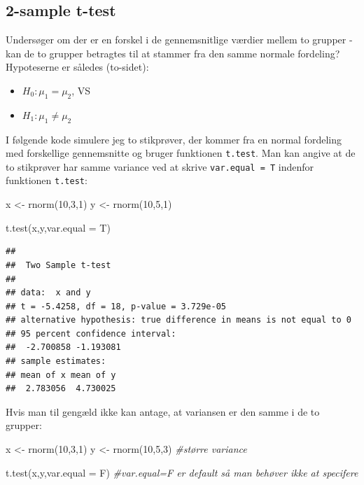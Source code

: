 \documentclass[
]{book}
\newenvironment{Shaded}{\begin{snugshade}}{\end{snugshade}}
\newcommand{\AttributeTok}[1]{\textcolor[rgb]{0.77,0.63,0.00}{#1}}
\newcommand{\CommentTok}[1]{\textcolor[rgb]{0.56,0.35,0.01}{\textit{#1}}}
\newcommand{\DecValTok}[1]{\textcolor[rgb]{0.00,0.00,0.81}{#1}}
\newcommand{\FunctionTok}[1]{\textcolor[rgb]{0.00,0.00,0.00}{#1}}
\newcommand{\NormalTok}[1]{#1}
\newcommand{\OtherTok}[1]{\textcolor[rgb]{0.56,0.35,0.01}{#1}}
\providecommand{\tightlist}{%
  \setlength{\itemsep}{0pt}\setlength{\parskip}{0pt}}
\begin{document}
\hypertarget{sample-t-test-1}{%
\subsection{2-sample t-test}\label{sample-t-test-1}}

Undersøger om der er en forskel i de gennemsnitlige værdier mellem to grupper - kan de to grupper betragtes til at stammer fra den samme normale fordeling? Hypoteserne er således (to-sidet):

\begin{itemize}
\tightlist
\item
  \(H_{0}: \mu_{1} = \mu_{2}\), VS
\item
  \(H_{1}: \mu_{1} \neq \mu_{2}\)
\end{itemize}

I følgende kode simulere jeg to stikprøver, der kommer fra en normal fordeling med forskellige gennemsnitte og bruger funktionen \texttt{t.test}. Man kan angive at de to stikprøver har samme variance ved at skrive \texttt{var.equal\ =\ T} indenfor funktionen \texttt{t.test}:

\begin{Shaded}
\begin{Highlighting}[]
\NormalTok{x }\OtherTok{\textless{}{-}} \FunctionTok{rnorm}\NormalTok{(}\DecValTok{10}\NormalTok{,}\DecValTok{3}\NormalTok{,}\DecValTok{1}\NormalTok{)}
\NormalTok{y }\OtherTok{\textless{}{-}} \FunctionTok{rnorm}\NormalTok{(}\DecValTok{10}\NormalTok{,}\DecValTok{5}\NormalTok{,}\DecValTok{1}\NormalTok{)}

\FunctionTok{t.test}\NormalTok{(x,y,}\AttributeTok{var.equal =}\NormalTok{ T)}
\end{Highlighting}
\end{Shaded}

\begin{verbatim}
## 
##  Two Sample t-test
## 
## data:  x and y
## t = -5.4258, df = 18, p-value = 3.729e-05
## alternative hypothesis: true difference in means is not equal to 0
## 95 percent confidence interval:
##  -2.700858 -1.193081
## sample estimates:
## mean of x mean of y 
##  2.783056  4.730025
\end{verbatim}

Hvis man til gengæld ikke kan antage, at variansen er den samme i de to grupper:

\begin{Shaded}
\begin{Highlighting}[]
\NormalTok{x }\OtherTok{\textless{}{-}} \FunctionTok{rnorm}\NormalTok{(}\DecValTok{10}\NormalTok{,}\DecValTok{3}\NormalTok{,}\DecValTok{1}\NormalTok{)}
\NormalTok{y }\OtherTok{\textless{}{-}} \FunctionTok{rnorm}\NormalTok{(}\DecValTok{10}\NormalTok{,}\DecValTok{5}\NormalTok{,}\DecValTok{3}\NormalTok{) }\CommentTok{\#større variance}

\FunctionTok{t.test}\NormalTok{(x,y,}\AttributeTok{var.equal =}\NormalTok{ F) }\CommentTok{\#var.equal=F er \textquotesingle{}default\textquotesingle{} så man behøver ikke at specifere}
\end{Highlighting}
\end{Shaded}
\end{document}
